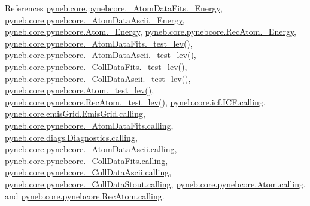 References \hyperlink{pynebcore_8py_source_l00101}{pyneb.\-core.\-pynebcore.\-\_\-\-Atom\-Data\-Fits.\-\_\-\-Energy}, \hyperlink{pynebcore_8py_source_l00413}{pyneb.\-core.\-pynebcore.\-\_\-\-Atom\-Data\-Ascii.\-\_\-\-Energy}, \hyperlink{pynebcore_8py_source_l01320}{pyneb.\-core.\-pynebcore.\-Atom.\-\_\-\-Energy}, \hyperlink{pynebcore_8py_source_l02662}{pyneb.\-core.\-pynebcore.\-Rec\-Atom.\-\_\-\-Energy}, \hyperlink{pynebcore_8py_source_l00178}{pyneb.\-core.\-pynebcore.\-\_\-\-Atom\-Data\-Fits.\-\_\-test\-\_\-lev()}, \hyperlink{pynebcore_8py_source_l00447}{pyneb.\-core.\-pynebcore.\-\_\-\-Atom\-Data\-Ascii.\-\_\-test\-\_\-lev()}, \hyperlink{pynebcore_8py_source_l00677}{pyneb.\-core.\-pynebcore.\-\_\-\-Coll\-Data\-Fits.\-\_\-test\-\_\-lev()}, \hyperlink{pynebcore_8py_source_l01045}{pyneb.\-core.\-pynebcore.\-\_\-\-Coll\-Data\-Ascii.\-\_\-test\-\_\-lev()}, \hyperlink{pynebcore_8py_source_l01525}{pyneb.\-core.\-pynebcore.\-Atom.\-\_\-test\-\_\-lev()}, \hyperlink{pynebcore_8py_source_l02672}{pyneb.\-core.\-pynebcore.\-Rec\-Atom.\-\_\-test\-\_\-lev()}, \hyperlink{icf_8py_source_l00016}{pyneb.\-core.\-icf.\-I\-C\-F.\-calling}, \hyperlink{emis_grid_8py_source_l00044}{pyneb.\-core.\-emis\-Grid.\-Emis\-Grid.\-calling}, \hyperlink{pynebcore_8py_source_l00097}{pyneb.\-core.\-pynebcore.\-\_\-\-Atom\-Data\-Fits.\-calling}, \hyperlink{diags_8py_source_l00169}{pyneb.\-core.\-diags.\-Diagnostics.\-calling}, \hyperlink{pynebcore_8py_source_l00318}{pyneb.\-core.\-pynebcore.\-\_\-\-Atom\-Data\-Ascii.\-calling}, \hyperlink{pynebcore_8py_source_l00585}{pyneb.\-core.\-pynebcore.\-\_\-\-Coll\-Data\-Fits.\-calling}, \hyperlink{pynebcore_8py_source_l00936}{pyneb.\-core.\-pynebcore.\-\_\-\-Coll\-Data\-Ascii.\-calling}, \hyperlink{pynebcore_8py_source_l01156}{pyneb.\-core.\-pynebcore.\-\_\-\-Coll\-Data\-Stout.\-calling}, \hyperlink{pynebcore_8py_source_l01229}{pyneb.\-core.\-pynebcore.\-Atom.\-calling}, and \hyperlink{pynebcore_8py_source_l02643}{pyneb.\-core.\-pynebcore.\-Rec\-Atom.\-calling}.


